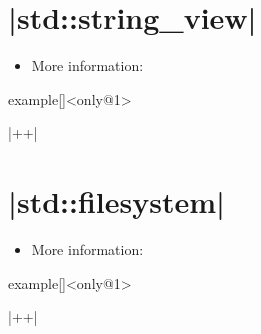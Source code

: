 \section{\CPP|std::string\_view|}
\begin{frame}[fragile]{\insertsectionhead}
    \vspace{-3mm}
    \begin{itemize}
        \item More information: 
    \end{itemize}
\end{frame}
\begin{frame}[fragile]{}
    \begin{varblock}{example}[\textwidth]{}<only@1>
        \begin{Cpp}
        \end{Cpp}
        \begin{Bash}[numbers=none]
            |++|
        \end{Bash}
    \end{varblock}
\end{frame}

\section{\CPP|std::filesystem|}
\begin{frame}[fragile]{\insertsectionhead}
    \vspace{-3mm}
    \begin{itemize}
        \item More information: 
    \end{itemize}
\end{frame}
\begin{frame}[fragile]{}
    \begin{varblock}{example}[\textwidth]{}<only@1>
        \begin{Cpp}
        \end{Cpp}
        \begin{Bash}[numbers=none]
            |++|
        \end{Bash}
    \end{varblock}
\end{frame}

